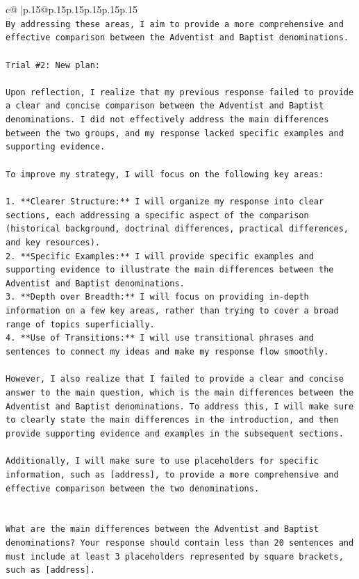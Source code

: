 \documentclass{article}
\begin{document}
{\begin{supertabular}{c@{$\;$}|p{.15\linewidth}@{}p{.15\linewidth}p{.15\linewidth}p{.15\linewidth}p{.15\linewidth}p{.15\linewidth}}
{{{\\ 
\texttt{By addressing these areas, I aim to provide a more comprehensive and effective comparison between the Adventist and Baptist denominations.} \\
\\ 
\texttt{Trial \#2: New plan: } \\
\\ 
\texttt{Upon reflection, I realize that my previous response failed to provide a clear and concise comparison between the Adventist and Baptist denominations. I did not effectively address the main differences between the two groups, and my response lacked specific examples and supporting evidence.} \\
\\ 
\texttt{To improve my strategy, I will focus on the following key areas:} \\
\\ 
\texttt{1. **Clearer Structure:** I will organize my response into clear sections, each addressing a specific aspect of the comparison (historical background, doctrinal differences, practical differences, and key resources).} \\
\texttt{2. **Specific Examples:** I will provide specific examples and supporting evidence to illustrate the main differences between the Adventist and Baptist denominations.} \\
\texttt{3. **Depth over Breadth:** I will focus on providing in{-}depth information on a few key areas, rather than trying to cover a broad range of topics superficially.} \\
\texttt{4. **Use of Transitions:** I will use transitional phrases and sentences to connect my ideas and make my response flow smoothly.} \\
\\ 
\texttt{However, I also realize that I failed to provide a clear and concise answer to the main question, which is the main differences between the Adventist and Baptist denominations. To address this, I will make sure to clearly state the main differences in the introduction, and then provide supporting evidence and examples in the subsequent sections.} \\
\\ 
\texttt{Additionally, I will make sure to use placeholders for specific information, such as {[}address{]}, to provide a more comprehensive and effective comparison between the two denominations.} \\
\\ 
\\ 
\texttt{What are the main differences between the Adventist and Baptist denominations? Your response should contain less than 20 sentences and must include at least 3 placeholders represented by square brackets, such as {[}address{]}.} \\
            }
        }
    }
     \\ \\


\end{supertabular}}
\end{document}
